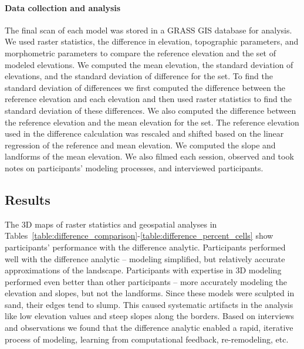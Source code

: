 \documentclass[Afour,sagev,times]{sagej} %
\begin{document}
\paragraph{Data collection and analysis}
The final scan of each model was stored in a 
GRASS GIS database for analysis. 
We used raster statistics, the difference in elevation, 
topographic parameters, and morphometric parameters
to compare the reference elevation 
and the set of modeled elevations. 
We computed 
the mean elevation,
the standard deviation of elevations, 
and the standard deviation of difference for the set.
To find the standard deviation of differences 
we first computed the difference 
between the reference elevation and each elevation 
and then used raster statistics 
to find the standard deviation of these differences.
We also computed the difference between the 
reference elevation and the mean elevation for the set. 
The reference elevation used in the difference calculation 
was rescaled and shifted based on the 
linear regression of the reference and mean elevation.
We computed the slope and landforms of the mean elevation. 
We also filmed each session, 
observed and took notes on participants' modeling processes, 
and interviewed participants.

\subsection{Results}
The 3D maps of raster statistics and geospatial analyses in
Tables~\ref{table:difference_comparison}-\ref{table:difference_percent_cells} 
show participants' performance with the difference analytic.
Participants performed well with the difference analytic 
-- modeling simplified, 
but relatively accurate approximations of the landscape.
Participants with expertise in 3D modeling 
performed even better than other participants 
-- more accurately modeling the elevation and slopes,
but not the landforms. 
Since these models were sculpted in sand,
their edges tend to slump.
This caused systematic artifacts in the analysis like
low elevation values and steep slopes
along the borders. 
Based on interviews and observations
we found that the difference analytic enabled
a rapid, iterative process 
of modeling, learning from computational feedback, 
re-remodeling, etc.
\end{document}
